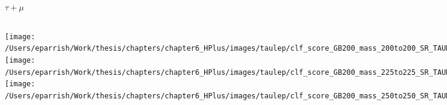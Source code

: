 \documentclass[aspectratio=169,xcolor=table]{beamer}
\begin{document}
    \begin{frame}[t]{$\tau+\mu$}
      \begin{columns}[t]
          \texttt{[image: /Users/eparrish/Work/thesis/chapters/chapter6\_HPlus/images/taulep/clf\_score\_GB200\_mass\_200to200\_SR\_TAUMU.png]}
          \texttt{[image: /Users/eparrish/Work/thesis/chapters/chapter6\_HPlus/images/taulep/clf\_score\_GB200\_mass\_225to225\_SR\_TAUMU.png]}
          \texttt{[image: /Users/eparrish/Work/thesis/chapters/chapter6\_HPlus/images/taulep/clf\_score\_GB200\_mass\_250to250\_SR\_TAUMU.png]}

          \texttt{[image: /Users/eparrish/Work/thesis/chapters/chapter6\_HPlus/images/taulep/clf\_score\_GB200\_mass\_275to275\_SR\_TAUMU.png]}
          \texttt{[image: /Users/eparrish/Work/thesis/chapters/chapter6\_HPlus/images/taulep/clf\_score\_GB200\_mass\_300to300\_SR\_TAUMU.png]}
          \texttt{[image: /Users/eparrish/Work/thesis/chapters/chapter6\_HPlus/images/taulep/clf\_score\_GB200\_mass\_350to350\_SR\_TAUMU.png]}

          \texttt{[image: /Users/eparrish/Work/thesis/chapters/chapter6\_HPlus/images/taulep/clf\_score\_GB200\_mass\_400to400\_SR\_TAUMU.png]}
          \texttt{[image: /Users/eparrish/Work/thesis/chapters/chapter6\_HPlus/images/taulep/clf\_score\_GB200\_mass\_500to500\_SR\_TAUMU.png]}
          \texttt{[image: /Users/eparrish/Work/thesis/chapters/chapter6\_HPlus/images/taulep/clf\_score\_GB200\_mass\_600to600\_SR\_TAUMU.png]}

          \texttt{[image: /Users/eparrish/Work/thesis/chapters/chapter6\_HPlus/images/taulep/clf\_score\_GB200\_mass\_700to700\_SR\_TAUMU.png]}
          \texttt{[image: /Users/eparrish/Work/thesis/chapters/chapter6\_HPlus/images/taulep/clf\_score\_GB200\_mass\_800to800\_SR\_TAUMU.png]}
          \texttt{[image: /Users/eparrish/Work/thesis/chapters/chapter6\_HPlus/images/taulep/clf\_score\_GB200\_mass\_900to900\_SR\_TAUMU.png]}

      \end{columns}
    \end{frame}
\end{document}
